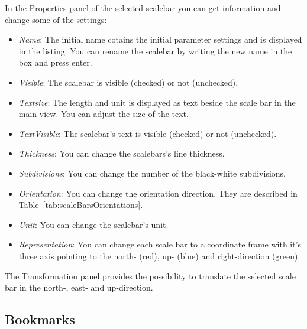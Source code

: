 In the Properties panel of the selected scalebar you can get information and change some of the settings:
\begin{itemize}
	\item \textit{Name}: The initial name cotains the initial parameter settings and is displayed in the listing. You can rename the scalebar by writing the new name in the box and press enter.
	\item \textit{Visible}: The scalebar is visible (checked) or not (unchecked).
	\item \textit{Textsize}: The length and unit is displayed as text beside the scale bar in the main view. You can adjust the size of the text.
	\item \textit{TextVisible}: The scalebar's text is visible (checked) or not (unchecked).
	\item \textit{Thickness}: You can change the scalebars's line thickness.
	\item \textit{Subdivisions}: You can change the number of the black-white subdivisions.
	\item \textit{Orientation}: You can change the orientation direction. They are described in Table~\ref{tab:scaleBarsOrientations}.
	\item \textit{Unit}: You can change the scalebar's unit.
	\item \textit{Representation}: You can change each scale bar to a coordinate frame with it's three axis pointing to the north- (red), up- (blue) and right-direction (green).
\end{itemize}

The Transformation panel provides the possibility to translate the selected scale bar in the north-, east- and up-direction.


\subsection{Bookmarks}
\label{sec:bookmarks}

